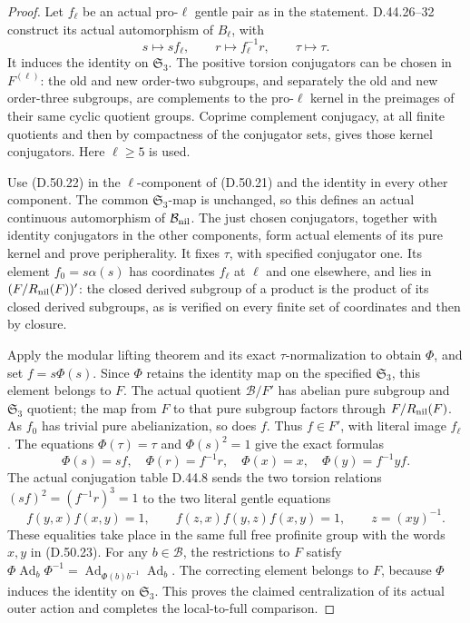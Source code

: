 \begin{proof}
Let \(f_\ell\) be an actual pro-\(\ell\) gentle pair
as in the statement. D.44.26--32 construct its actual
automorphism of \(B_\ell\), with
\[
       s\longmapsto sf_\ell,\qquad
       r\longmapsto f_\ell^{-1}r,\qquad \tau\longmapsto\tau.
 \tag{D.50.22}
\]
It induces the identity on \(\mathfrak S_3\).
The positive torsion conjugators can be chosen in
\(F^{(\ell)}\): the old and new order-two subgroups,
and separately the old and new order-three subgroups,
are complements to the pro-\(\ell\) kernel in the
preimages of their same cyclic quotient groups.
Coprime complement conjugacy, at all finite quotients
and then by compactness of the conjugator sets, gives
those kernel conjugators. Here \(\ell\geq5\) is used.

Use \textup{(D.50.22)} in the \(\ell\)-component of
\textup{(D.50.21)} and the identity in every other
component. The common \(\mathfrak S_3\)-map is unchanged,
so this defines an actual continuous automorphism of
\(\mathcal B_{\rm nil}\).
The just chosen conjugators, together with identity
conjugators in the other components, form actual
elements of its pure kernel and prove peripherality.
It fixes \(\tau\), with specified conjugator one.
Its element \(f_0=s\alpha(s)\) has coordinates
\(f_\ell\) at \(\ell\) and one elsewhere, and lies in
\((F/R_{\rm nil}(F))'\): the closed derived subgroup
of a product is the product of its closed derived
subgroups, as is verified on every finite set of
coordinates and then by closure.

Apply the modular lifting theorem and its exact
\(\tau\)-normalization to obtain \(\Phi\), and set
\(f=s\Phi(s)\). Since \(\Phi\) retains the identity
map on the specified \(\mathfrak S_3\), this element
belongs to \(F\). The actual quotient
\(\mathcal B/F'\) has abelian pure subgroup and
\(\mathfrak S_3\) quotient; the map from \(F\) to
that pure subgroup factors through \(F/R_{\rm nil}(F)\).
As \(f_0\) has trivial pure abelianization, so does
\(f\). Thus \(f\in F'\), with literal image
\(f_\ell\).
The equations \(\Phi(\tau)=\tau\) and \(\Phi(s)^2=1\)
give the exact formulas
\[
 \Phi(s)=sf,\quad \Phi(r)=f^{-1}r,\quad
       \Phi(x)=x,\quad \Phi(y)=f^{-1}yf.
 \tag{D.50.23}
\]
The actual conjugation table D.44.8 sends the two
torsion relations \((sf)^2=(f^{-1}r)^3=1\) to the
two literal gentle equations
\[
           f(y,x)f(x,y)=1,\qquad
           f(z,x)f(y,z)f(x,y)=1,
                 \qquad z=(xy)^{-1}.
 \tag{D.50.24}
\]
These equalities take place in the same full free
profinite group with the words \(x,y\) in
\textup{(D.50.23)}.
For any \(b\in\mathcal B\), the restrictions to \(F\)
satisfy
\(\Phi\operatorname{Ad}_b\Phi^{-1}=
\operatorname{Ad}_{\Phi(b)b^{-1}}\operatorname{Ad}_b\).
The correcting element belongs to \(F\), because
\(\Phi\) induces the identity on \(\mathfrak S_3\).
This proves the claimed centralization of its actual
outer action and completes the local-to-full comparison.


\end{proof}
